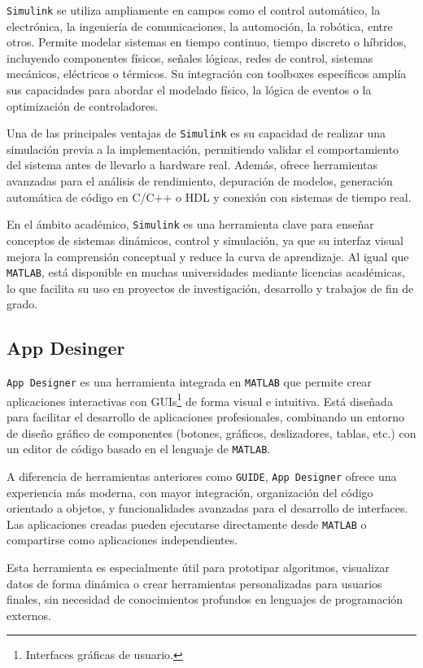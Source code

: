 \texttt{Simulink} se utiliza ampliamente en campos como el control automático, la electrónica, la ingeniería de comunicaciones, la automoción, la robótica, entre otros. Permite modelar sistemas en tiempo continuo, tiempo discreto o híbridos, incluyendo componentes físicos, señales lógicas, redes de control, sistemas mecánicos, eléctricos o térmicos. Su integración con toolboxes específicos amplía sus capacidades para abordar el modelado físico, la lógica de eventos o la optimización de controladores.

Una de las principales ventajas de \texttt{Simulink} es su capacidad de realizar una simulación previa a la implementación, permitiendo validar el comportamiento del sistema antes de llevarlo a hardware real. Además, ofrece herramientas avanzadas para el análisis de rendimiento, depuración de modelos, generación automática de código en C/C++ o HDL y conexión con sistemas de tiempo real.

En el ámbito académico, \texttt{Simulink} es una herramienta clave para enseñar conceptos de sistemas dinámicos, control y simulación, ya que su interfaz visual mejora la comprensión conceptual y reduce la curva de aprendizaje. Al igual que \texttt{MATLAB}, está disponible en muchas universidades mediante licencias académicas, lo que facilita su uso en proyectos de investigación, desarrollo y trabajos de fin de grado.

\subsection{App Desinger}
\texttt{App Designer} \cite{mathworks_matlab} es una herramienta integrada en \texttt{MATLAB} que permite crear aplicaciones interactivas con GUIs\footnote{Interfaces gráficas de usuario.} de forma visual e intuitiva. Está diseñada para facilitar el desarrollo de aplicaciones profesionales, combinando un entorno de diseño gráfico de componentes (botones, gráficos, deslizadores, tablas, etc.) con un editor de código basado en el lenguaje de \texttt{MATLAB}.

A diferencia de herramientas anteriores como \texttt{GUIDE}, \texttt{App Designer} ofrece una experiencia más moderna, con mayor integración, organización del código orientado a objetos, y funcionalidades avanzadas para el desarrollo de interfaces. Las aplicaciones creadas pueden ejecutarse directamente desde \texttt{MATLAB} o compartirse como aplicaciones independientes.

Esta herramienta es especialmente útil para prototipar algoritmos, visualizar datos de forma dinámica o crear herramientas personalizadas para usuarios finales, sin necesidad de conocimientos profundos en lenguajes de programación externos.

